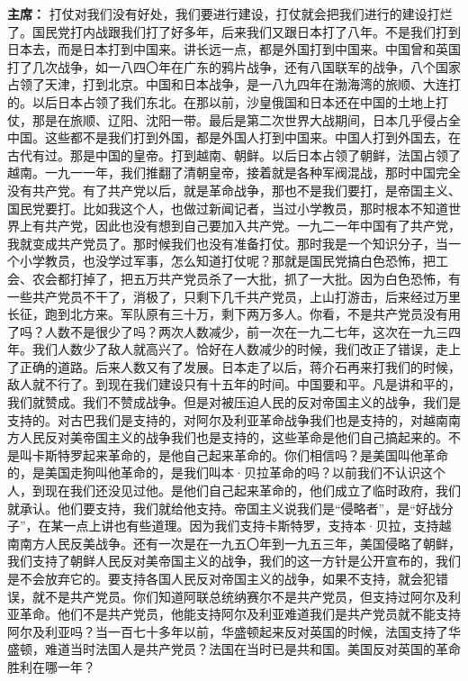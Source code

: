 \begin{duihua}
\item[\textbf{主席：}] 打仗对我们没有好处，我们要进行建设，打仗就会把我们进行的建设打烂了。国民党打内战跟我们打了好多年，后来我们又跟日本打了八年。不是我们打到日本去，而是日本打到中国来。讲长远一点，都是外国打到中国来。中国曾和英国打了几次战争，如一八四〇年在广东的鸦片战争，还有八国联军的战争，八个国家占领了天津，打到北京。中国和日本战争，是一八九四年在渤海湾的旅顺、大连打的。以后日本占领了我们东北。在那以前，沙皇俄国和日本还在中国的土地上打仗，那是在旅顺、辽阳、沈阳一带。最后是第二次世界大战期间，日本几乎侵占全中国。这些都不是我们打到外国，都是外国人打到中国来。中国人打到外国去，在古代有过。那是中国的皇帝。打到越南、朝鲜。以后日本占领了朝鲜，法国占领了越南。一九一一年，我们推翻了清朝皇帝，接着就是各种军阀混战，那时中国完全没有共产党。有了共产党以后，就是革命战争，那也不是我们要打，是帝国主义、国民党要打。比如我这个人，也做过新闻记者，当过小学教员，那时根本不知道世界上有共产党，因此也没有想到自己要加入共产党。一九二一年中国有了共产党，我就变成共产党员了。那时候我们也没有准备打仗。那时我是一个知识分子，当一个小学教员，也没学过军事，怎么知道打仗呢？那就是国民党搞白色恐怖，把工会、农会都打掉了，把五万共产党员杀了一大批，抓了一大批。因为白色恐怖，有一些共产党员不干了，消极了，只剩下几千共产党员，上山打游击，后来经过万里长征，跑到北方来。军队原有三十万，剩下两万多人。你看，不是共产党员没有用了吗？人数不是很少了吗？两次人数减少，前一次在一九二七年，这次在一九三四年。我们人数少了敌人就高兴了。恰好在人数减少的时候，我们改正了错误，走上了正确的道路。后来人数又有了发展。日本走了以后，蒋介石再来打我们的时候，敌人就不行了。到现在我们建设只有十五年的时间。中国要和平。凡是讲和平的，我们就赞成。我们不赞成战争。但是对被压迫人民的反对帝国主义的战争，我们是支持的。对古巴我们是支持的，对阿尔及利亚革命战争我们也是支持的，对越南南方人民反对美帝国主义的战争我们也是支持的，这些革命是他们自己搞起来的。不是叫卡斯特罗起来革命的，是他自己起来革命的。你们相信吗？是美国叫他革命的，是美国走狗叫他革命的，是我们叫本·贝拉革命的吗？以前我们不认识这个人，到现在我们还没见过他。是他们自己起来革命的，他们成立了临时政府，我们就承认。他们要支持，我们就给他支持。帝国主义说我们是“侵略者”，是“好战分子”，在某一点上讲也有些道理。因为我们支持卡斯特罗，支持本·贝拉，支持越南南方人民反美战争。还有一次是在一九五〇年到一九五三年，美国侵略了朝鲜，我们支持了朝鲜人民反对美帝国主义的战争，我们的这一方针是公开宣布的，我们是不会放弃它的。要支持各国人民反对帝国主义的战争，如果不支持，就会犯错误，就不是共产党员。你们知道阿联总统纳赛尔不是共产党员，但支持过阿尔及利亚革命。他们不是共产党员，他能支持阿尔及利亚难道我们是共产党员就不能支持阿尔及利亚吗？当一百七十多年以前，华盛顿起来反对英国的时候，法国支持了华盛顿，难道当时法国人是共产党员？法国在当时已是共和国。美国反对英国的革命胜利在哪一年？


\end{duihua}
